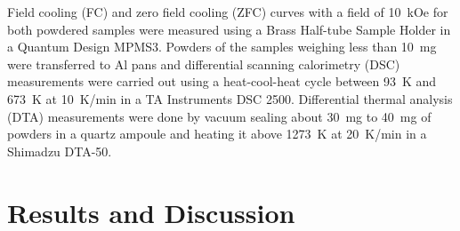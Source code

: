 \documentclass[10pt,doublespacing,edeposit]{uiucthesis2020}
\begin{document}
\begin{mainmatter}
Field cooling (FC) and zero field cooling (ZFC) curves with a field of 10~kOe for both powdered samples were measured using a Brass Half-tube Sample Holder in a Quantum Design MPMS3. Powders of the samples weighing less than 10~mg were transferred to Al pans and differential scanning calorimetry (DSC) measurements were carried out using a heat-cool-heat cycle between 93~K and 673~K at 10~K/min in a TA Instruments DSC 2500. Differential thermal analysis (DTA) measurements were done by vacuum sealing about 30~mg to 40~mg of powders in a quartz ampoule and heating it above 1273~K at 20~K/min in a Shimadzu DTA-50.


\section{Results and Discussion}

\end{mainmatter}
\end{document}
